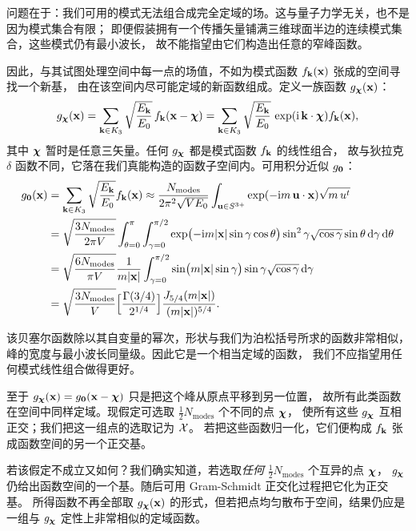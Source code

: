 问题在于：我们可用的模式无法组合成完全定域的场。这与量子力学无关，也不是因为模式集合有限；
即便假装拥有一个传播矢量铺满三维球面半边的连续模式集合，这些模式仍有最小波长，
故不能指望由它们构造出任意的窄峰函数。

因此，与其试图处理空间中每一点的场值，不如为模式函数 $f_{\mathbf{k}}(\mathbf{x})$ 张成的空间寻找一个新基，
由在该空间内尽可能定域的新函数组成。定义一族函数 $g_{\boldsymbol{\chi}}(\mathbf{x})$：
\begin{equation*}
g_{\boldsymbol{\chi}}(\mathbf{x})=\sum_{\mathbf{k}\in K_{3}}\sqrt{\frac{E_{\mathbf{k}}}{E_{0}}}\,f_{\mathbf{k}}(\mathbf{x}-\boldsymbol{\chi})
=\sum_{\mathbf{k}\in K_{3}}\sqrt{\frac{E_{\mathbf{k}}}{E_{0}}}\,\exp(\mathrm{i}\,\mathbf{k}\cdot\boldsymbol{\chi})f_{\mathbf{k}}(\mathbf{x}),
\end{equation*}
其中 $\boldsymbol{\chi}$ 暂时是任意三矢量。任何 $g_{\boldsymbol{\chi}}$ 都是模式函数 $f_{\mathbf{k}}$ 的线性组合，
故与狄拉克 $\delta$ 函数不同，它落在我们真能构造的函数子空间内。可用积分近似 $g_{\mathbf{0}}$：
\begin{align*}
g_{\mathbf{0}}(\mathbf{x})&=\sum_{\mathbf{k}\in K_{3}}\sqrt{\frac{E_{\mathbf{k}}}{E_{0}}}f_{\mathbf{k}}(\mathbf{x})
\approx\frac{N_{\text{modes}}}{2\pi^{2}\sqrt{VE_{0}}}\int_{\mathbf{u}\in S^{3+}}\exp(-\mathrm{i} m\,\mathbf{u}\cdot\mathbf{x})\sqrt{m\,u^{t}}\\
&=\sqrt{\frac{3N_{\text{modes}}}{2\pi V}}\int_{\theta=0}^{\pi}\int_{\gamma=0}^{\pi/2}
\exp\bigl(-\mathrm{i} m|\mathbf{x}|\sin\gamma\cos\theta\bigr)\sin^{2}\gamma\sqrt{\cos\gamma}\sin\theta\,\mathrm{d}\gamma\,\mathrm{d}\theta\\
&=\sqrt{\frac{6N_{\text{modes}}}{\pi V}}\frac{1}{m|\mathbf{x}|}
\int_{\gamma=0}^{\pi/2}\sin\bigl(m|\mathbf{x}|\sin\gamma\bigr)\sin\gamma\sqrt{\cos\gamma}\,\mathrm{d}\gamma\\
&=\sqrt{\frac{3N_{\text{modes}}}{V}}\Bigl[\frac{\Gamma(3/4)}{2^{1/4}}\Bigr]
\frac{J_{5/4}(m|\mathbf{x}|)}{(m|\mathbf{x}|)^{5/4}} .
\end{align*}


该贝塞尔函数除以其自变量的幂次，形状与我们为泊松括号所求的函数非常相似，
峰的宽度与最小波长同量级。因此它是一个相当定域的函数，
我们不应指望用任何模式线性组合做得更好。

至于 $g_{\boldsymbol{\chi}}(\mathbf{x})=g_{\mathbf{0}}(\mathbf{x}-\boldsymbol{\chi})$ 只是把这个峰从原点平移到另一位置，
故所有此类函数在空间中同样定域。现假定可选取 $\tfrac12 N_{\text{modes}}$ 个不同的点 $\boldsymbol{\chi}$，
使所有这些 $g_{\boldsymbol{\chi}}$ 互相正交；我们把这一组点的选取记为 $\mathcal{X}$。
若把这些函数归一化，它们便构成 $f_{\mathbf{k}}$ 张成函数空间的另一个正交基。

若该假定不成立又如何？我们确实知道，若选取\emph{任何} $\tfrac12 N_{\text{modes}}$ 个互异的点 $\boldsymbol{\chi}$，
$g_{\boldsymbol{\chi}}$ 仍给出函数空间的一个基。随后可用 Gram-Schmidt 正交化过程把它化为正交基。
所得函数不再全部取 $g_{\boldsymbol{\chi}}(\mathbf{x})$ 的形式，但若把点均匀散布于空间，结果仍应是一组与 $g_{\boldsymbol{\chi}}$
定性上非常相似的定域函数。

